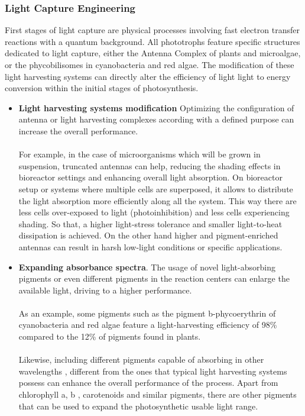\subsubsection{Light Capture Engineering}
First stages of light capture are physical processes involving fast electron transfer reactions with a quantum background. All phototrophs feature specific structures dedicated to light capture, either the Antenna Complex of plants and microalgae, or the phycobilisomes in cyanobacteria and red algae. The modification of these light harvesting systems can directly alter the efficiency of light light to energy conversion within the initial stages of photosynthesis.
\begin{itemize}
    \item[]  \textbf{Light harvesting systems modification} Optimizing the configuration of antenna or light harvesting complexes according with a defined purpose can increase the overall performance. \\ \\
    For example, in the case of microorganisms which will be grown in suspension, truncated antennas can help, reducing the shading effects in bioreactor settings and enhancing overall light absorption. On bioreactor setup or systems where multiple cells are superposed, it allows to distribute the light absorption more efficiently along all the system.  This way there are less cells over-exposed to light (photoinhibition) and less cells experiencing shading. So that, a higher light-stress tolerance and smaller light-to-heat dissipation is achieved. On the other hand higher and pigment-enriched antennas can result in harsh low-light conditions or specific applications.
    \item[] \textbf{Expanding absorbance spectra}. The usage of novel light-absorbing pigments or even different pigments in the reaction centers can enlarge the available light, driving to a higher performance. \\ \\
    As an example, some pigments such as the pigment b-phycoerythrin  of cyanobacteria and red algae feature a light-harvesting efficiency of 98\% compared to the 12\% of pigments found in plants. \\ \\
   Likewise, including different pigments capable of absorbing in other wavelengths , different from the ones that typical light harvesting systems possess can enhance the overall performance of the process. Apart from chlorophyll a, b , carotenoids and similar pigments, there are other pigments that can be used to expand the photosynthetic usable light range.\\ \\

\end{itemize}
